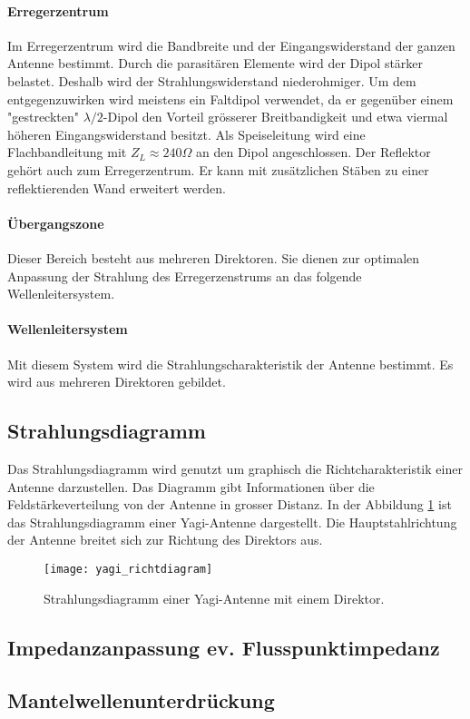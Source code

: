 \paragraph{Erregerzentrum}
Im Erregerzentrum wird die Bandbreite und der Eingangswiderstand der ganzen Antenne bestimmt. Durch die parasitären Elemente wird der Dipol stärker belastet. Deshalb wird der Strahlungswiderstand niederohmiger. Um dem entgegenzuwirken wird meistens ein Faltdipol verwendet, da er gegenüber einem "gestreckten" $\lambda/2 $-Dipol den Vorteil grösserer Breitbandigkeit und etwa viermal höheren Eingangswiderstand besitzt. Als Speiseleitung wird eine Flachbandleitung mit $ Z_{L} \approx 240\Omega $ an den Dipol angeschlossen. Der Reflektor gehört auch zum Erregerzentrum. Er kann mit zusätzlichen Stäben zu einer reflektierenden Wand erweitert werden.
\paragraph{Übergangszone}
Dieser Bereich besteht aus mehreren Direktoren. Sie dienen zur optimalen Anpassung der Strahlung des Erregerzenstrums an das folgende Wellenleitersystem.
\paragraph{Wellenleitersystem}
Mit diesem System wird die Strahlungscharakteristik der Antenne bestimmt. Es wird aus mehreren Direktoren gebildet.

\subsection{Strahlungsdiagramm}\label{sec:Strahlungsdiagramm}

Das Strahlungsdiagramm wird genutzt um  graphisch die Richtcharakteristik einer Antenne darzustellen. Das Diagramm gibt Informationen über die Feldstärkeverteilung von der Antenne in grosser Distanz. In der Abbildung \ref*{fig:richtdiagram} ist das Strahlungsdiagramm einer Yagi-Antenne dargestellt. Die Hauptstahlrichtung der Antenne breitet sich zur Richtung des Direktors aus. 

\begin{figure}[H]
	\centering
	\texttt{[image: yagi\_richtdiagram]}
	\caption{Strahlungsdiagramm einer Yagi-Antenne mit einem Direktor.}\label{fig:richtdiagram}
\end{figure}

\subsection{Impedanzanpassung ev. Flusspunktimpedanz}\label{sec:Impedanzanpassung}


\subsection{Mantelwellenunterdrückung}\label{sec:Mantelwellenunterdrückung}